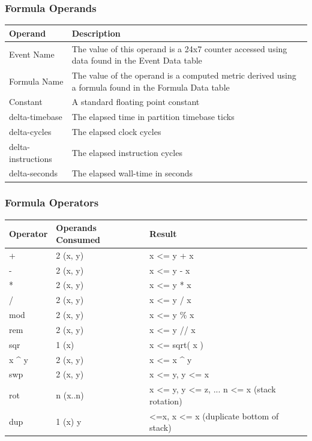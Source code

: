 \documentclass[14]{article}
\begin{document}
\subsubsection{Formula Operands}
\begin{center}
\begin{tabular}[l]{|l|p{7cm}|}
\hline
\textbf{Operand} & \textbf{Description} \\ \hline
Event Name & The value of this operand is a 24x7 counter accessed using data
             found in the Event Data table \\ \hline
Formula Name & The value of the operand is a computed metric derived using a
               formula found in the Formula Data table \\ \hline
Constant & A standard floating point constant \\ \hline
delta-timebase & The elapsed time in partition timebase ticks \\ \hline
delta-cycles & The elapsed clock cycles \\ \hline
delta-instructions & The elapsed instruction cycles \\ \hline
delta-seconds & The elapsed wall-time in seconds \\ \hline
\end{tabular}
\end{center}

\subsubsection{Formula Operators}
\begin{center}
\begin{tabular}[l]{|l|l|l|}
\hline
\textbf{Operator} & \textbf{Operands Consumed} & \textbf{Result} \\ \hline
+ & 2 (x, y) & x <= y + x \\ \hline
- & 2 (x, y) & x <= y - x \\ \hline
* & 2 (x, y) & x <= y * x \\ \hline
/ & 2 (x, y) & x <= y / x \\ \hline
mod & 2 (x, y) & x <= y \% x \\ \hline
rem & 2 (x, y) & x <= y // x \\ \hline
sqr & 1 (x) & x <= sqrt( x ) \\ \hline
x \^{} y & 2 (x, y) & x <= x \^{} y \\ \hline
swp & 2 (x, y) & x <= y, y <= x \\ \hline
rot & n (x..n) & x <= y, y <= z, ... n <= x (stack rotation) \\ \hline
dup & 1 (x) y & <=x, x <= x (duplicate bottom of stack) \\ \hline


\end{tabular}
\end{center}
\end{document}
